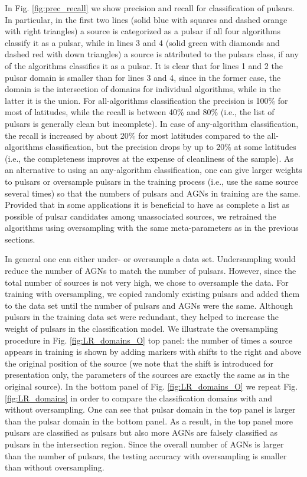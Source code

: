 \documentclass[referee]{aa} %
\begin{document}
In Fig. \ref{fig:prec_recall} we show precision and recall for classification of pulsars.
In particular, in the first two lines (solid blue with squares and dashed orange with right triangles) a source is categorized as a pulsar if all four algorithms classify it as a pulsar,
while in lines 3 and 4 (solid green with diamonds and dashed red with down triangles) a source is attributed to the pulsars class, if any of the algorithms classifies it as a pulsar.
It is clear that for lines 1 and 2 the pulsar domain is smaller than for lines 3 and 4, since in the former case, the domain is the intersection of domains for individual algorithms, while in the latter it is the union.
For all-algorithms classification the precision is 100\% for most of latitudes, while the recall is between 40\% and 80\% (i.e., the list of pulsars is generally clean but incomplete).
In case of any-algorithm classification, the recall is increased by about 20\% for most latitudes compared to the all-algorithms classification, but the precision drops by up to 20\% at some latitudes (i.e., the completeness improves at the expense of cleanliness of the sample).
As an alternative to using an any-algorithm classification, one can give larger weights to pulsars or oversample pulsars in the training process (i.e., use the same source several times) so that the numbers of pulsars and AGNs in training are the same.
Provided that in some applications it is beneficial to have as complete a list as possible of pulsar candidates among unassociated sources, we retrained the algorithms using oversampling with the same meta-parameters as in the previous sections.

In general one can either under- or oversample a data set. Undersampling would reduce the number of AGNs to match the number of pulsars. However, since the total number of sources is not very high, we chose to oversample the data. 
For training with oversampling, we copied randomly existing pulsars and added them to the data set until the number of pulsars and AGNs were the same.
Although pulsars in the training data set were redundant, they helped to increase the weight of pulsars in the classification model.
We illustrate the oversampling procedure in Fig. \ref{fig:LR_domains_O} top panel:
the number of times a source appears in training is shown by adding markers with shifts to the right and above the original position of the source (we note that the shift is introduced for presentation only, the parameters of the sources are exactly the same as in the original source).
In the bottom panel of Fig. \ref{fig:LR_domains_O} we repeat Fig.  \ref{fig:LR_domains} in order to compare the classification domains with and without oversampling.
One can see that pulsar domain in the top panel is larger than the pulsar domain in the bottom panel.
As a result, in the top panel more pulsars are classified as pulsars but also more AGNs are falsely classified as pulsars in the intersection region. 
Since the overall number of AGNs is larger than the number of pulsars, the testing accuracy with oversampling is smaller than without oversampling.
\end{document}
